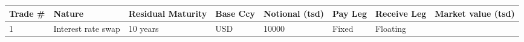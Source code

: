 \begin{longtable}[]{@{}llllllll@{}}
\toprule
\begin{minipage}[b]{0.04\columnwidth}\raggedright
Trade \#\strut
\end{minipage} & \begin{minipage}[b]{0.10\columnwidth}\raggedright
Nature\strut
\end{minipage} & \begin{minipage}[b]{0.09\columnwidth}\raggedright
Residual Maturity\strut
\end{minipage} & \begin{minipage}[b]{0.07\columnwidth}\raggedright
Base Ccy\strut
\end{minipage} & \begin{minipage}[b]{0.11\columnwidth}\raggedright
Notional (tsd)\strut
\end{minipage} & \begin{minipage}[b]{0.11\columnwidth}\raggedright
Pay Leg\strut
\end{minipage} & \begin{minipage}[b]{0.13\columnwidth}\raggedright
Receive Leg\strut
\end{minipage} & \begin{minipage}[b]{0.13\columnwidth}\raggedright
Market value (tsd)\strut
\end{minipage}\tabularnewline
\midrule
\endhead
\begin{minipage}[t]{0.04\columnwidth}\raggedright
1\strut
\end{minipage} & \begin{minipage}[t]{0.10\columnwidth}\raggedright
Interest rate swap\strut
\end{minipage} & \begin{minipage}[t]{0.09\columnwidth}\raggedright
10 years\strut
\end{minipage} & \begin{minipage}[t]{0.07\columnwidth}\raggedright
USD\strut
\end{minipage} & \begin{minipage}[t]{0.11\columnwidth}\raggedright
10000\strut
\end{minipage} & \begin{minipage}[t]{0.11\columnwidth}\raggedright
Fixed\strut
\end{minipage} & \begin{minipage}[t]{0.13\columnwidth}\raggedright
Floating\strut
\end{minipage} & \begin{minipage}[t]{0.13\columnwidth}\raggedright

\end{minipage}
\end{longtable}
